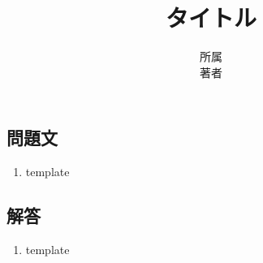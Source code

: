 \documentclass[dvipdfmx,titlepage, 11pt, a4paper]{jsarticle}%
\title{\Huge タイトル\\[10mm]}
\author{{\LARGE 所属}\\[1mm]\LARGE 著者}
\date{}
\begin{document}
\maketitle
\tableofcontents %
\newpage
\setcounter{tocdepth}{3}%
\section{}%
\subsection{問題文}
\begin{enumerate}[(1)]
  \item template
\end{enumerate}
\newpage
\subsection{解答}
\begin{enumerate}[(1)]
  \item template
\end{enumerate}
{}
\end{document}
